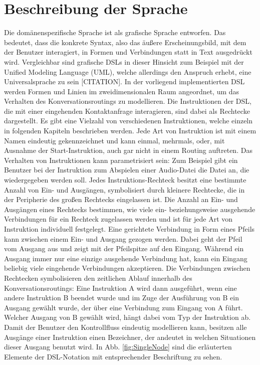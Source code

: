 \section{Beschreibung der Sprache}
Die domänenspezifische Sprache ist als grafische Sprache entworfen. Das bedeutet, dass die konkrete Syntax, also das äußere Erscheinungsbild, mit dem der Benutzer interagiert, in Formen und Verbindungen statt in Text ausgedrückt wird. Vergleichbar sind grafische DSLs in dieser Hinsicht zum Beispiel mit der Unified Modeling Language (UML), welche allerdings den Anspruch erhebt, eine Universalsprache zu sein [CITATION].
\newline 
In der vorliegend implementierten DSL werden Formen und Linien im zweidimensionalen Raum angeordnet, um das Verhalten des Konversationsroutings zu modellieren. Die Instruktionen der DSL, die mit einer eingehenden Kontaktanfrage interagieren, sind dabei als Rechtecke dargestellt. Es gibt eine Vielzahl von verschiedenen Instruktionen, welche einzeln in folgenden Kapiteln beschrieben werden. Jede Art von  Instruktion ist mit einem Namen eindeutig gekennzeichnet und kann einmal, mehrmals, oder, mit Ausnahme der Start-Instruktion, auch gar nicht in einem Routing auftreten. Das Verhalten von Instruktionen kann parametrisiert sein: Zum Beispiel gibt ein Benutzer bei der Instruktion zum Abspielen einer Audio-Datei die Datei an, die wiedergegeben werden soll. Jedes Instruktions-Rechteck besitzt eine bestimmte Anzahl von Ein- und Ausgängen, symbolisiert durch kleinere Rechtecke, die in der Peripherie des großen Rechtecks eingelassen ist. Die Anzahl an Ein- und Ausgängen eines Rechtecks bestimmen, wie viele ein- beziehungsweise ausgehende Verbindungen für ein Rechteck zugelassen werden und ist für jede Art von Instruktion individuell festgelegt. Eine gerichtete Verbindung in Form eines Pfeils kann zwischen einem Ein- und Ausgang gezogen werden. Dabei geht der Pfeil vom Ausgang aus und zeigt mit der Pfeilspitze auf den Eingang. Während ein Ausgang immer nur eine einzige ausgehende Verbindung hat, kann ein Eingang beliebig viele eingehende Verbindungen akzeptieren. Die Verbindungen zwischen Rechtecken symbolisieren den zeitlichen Ablauf innerhalb des Konversationsroutings: Eine Instruktion A wird dann ausgeführt, wenn eine andere Instruktion B beendet wurde und im Zuge der Ausführung von B ein Ausgang gewählt wurde, der über eine Verbindung zum Eingang von A führt. Welcher Ausgang von B gewählt wird, hängt dabei vom Typ der Instruktion ab. Damit der Benutzer den Kontrollfluss eindeutig modellieren kann, besitzen alle Ausgänge einer Instruktion einen Bezeichner, der andeutet in welchen Situationen dieser Ausgang benutzt wird.  In Abb. \ref{fig:SingleNode} sind die erläuterten Elemente der DSL-Notation mit entsprechender Beschriftung zu sehen.
